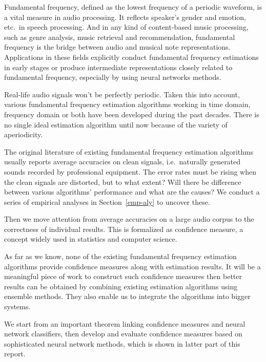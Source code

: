 \documentclass[11pt,a4paper,titlepage]{article}
\begin{document}
\bigskip

Fundamental frequency, defined as the lowest frequency of a periodic waveform, is a vital measure in audio processing.
It reflects speaker's gender and emotion, etc.\ in speech processing.
And in any kind of content-based music processing, such as genre analysis, music retrieval and recommendation, fundamental frequency is the bridge between audio and musical note representations.
Applications in these fields explicitly conduct fundamental frequency estimations in early stages or produce intermediate representations closely related to fundamental frequency, especially by using neural networks methods.

Real-life audio signals won't be perfectly periodic.
Taken this into account, various fundamental frequency estimation algorithms working in time domain, frequency domain or both have been developed during the past decades.
There is no single ideal estimation algorithm until now because of the variety of aperiodicity.

The original literature of existing fundamental frequency estimation algorithms usually reports average accuracies on clean signals, i.e.\ naturally generated sounds recorded by professional equipment.
The error rates must be rising when the clean signals are distorted, but to what extent? Will there be difference between various algorithms' performance and what are the causes? We conduct a series of empirical analyses in Section~\ref{emp-aly} to uncover these.

\bigskip

Then we move attention from average accuracies on a large audio corpus to the correctness of individual results.
This is formalized as confidence measure, a concept widely used in statistics and computer science.

As far as we know, none of the existing fundamental frequency estimation algorithms provide confidence measures along with estimation results.
It will be a meaningful piece of work to construct such confidence measures then better results can be obtained by combining existing estimation algorithms using ensemble methods.
They also enable us to integrate the algorithms into bigger systems.

We start from an important theorem linking confidence measures and neural network classifiers, then develop and evaluate confidence measures based on sophisticated neural network methods, which is shown in latter part of this report.

\newpage
\end{document}
